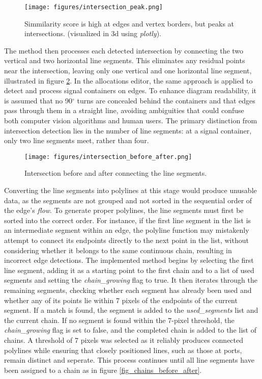 \begin{figure}
    \centering
    \texttt{[image: figures/intersection\_peak.png]}
    \caption{Simmilarity score is high at edges and vertex borders, but peaks at intersections. (visualized in 3d using \textit{plotly}).}
    \label{fig_intersection_peak}
\end{figure}

The method then processes each detected intersection by connecting the two vertical and two horizontal line segments. This eliminates any residual points near the intersection, leaving only one vertical and one horizontal line segment, illustrated in figure \ref{fig:_intersection_before_after}.
In the allocations editor, the same approach is applied to detect and process signal containers on edges. To enhance diagram readability, it is assumed that no 90$^{\circ}$ turns are concealed behind the containers and that edges pass through them in a straight line, avoiding ambiguities that could confuse both computer vision algorithms and human users. The primary distinction from intersection detection lies in the number of line segments: at a signal container, only two line segments meet, rather than four.
\begin{figure}[h]
    \centering
    \texttt{[image: figures/intersection\_before\_after.png]}
    \caption{Intersection before and after connecting the line segments.}
    \label{fig:_intersection_before_after}
\end{figure}
Converting the line segments into polylines at this stage would produce unusable data, as the segments are not grouped and not sorted in the sequential order of the edge's \textit{flow}. To generate proper polylines, the line segments must first be sorted into the correct order. For instance, if the first line segment in the list is an intermediate segment within an edge, the polyline function may mistakenly attempt to connect its endpoints directly to the next point in the list, without considering whether it belongs to the same continuous chain, resulting in incorrect edge detections.
The implemented method begins by selecting the first line segment, adding it as a starting point to the first chain and to a list of used segments and setting the \textit{chain\_growing} flag to true. It then iterates through the remaining segments, checking whether each segment has already been used and whether any of its points lie within 7 pixels of the endpoints of the current segment. If a match is found, the segment is added to the \textit{used\_segments} list and the current chain. If no segment is found within the 7-pixel threshold, the \textit{chain\_growing} flag is set to false, and the completed chain is added to the list of chains. A threshold of 7 pixels was selected as it reliably produces connected polylines while ensuring that closely positioned lines, such as those at ports, remain distinct and seperate. This process continues until all line segments have been assigned to a chain as in figure \ref{fig_chains_before_after}.
